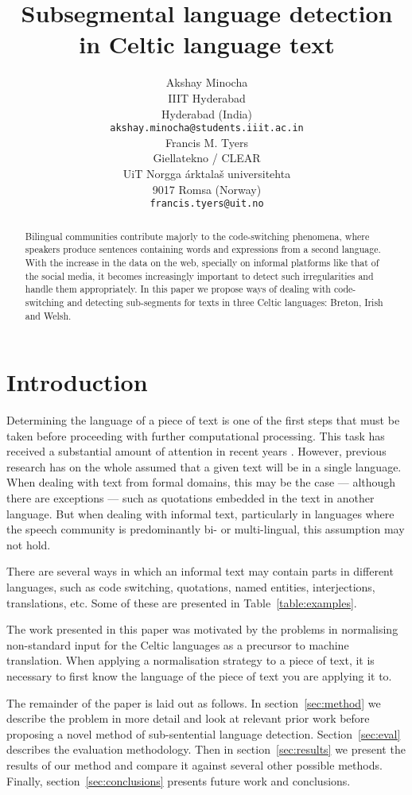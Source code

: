 \documentclass[11pt]{article}
\title{Subsegmental language detection in Celtic language text}
\author{}
\author{Akshay Minocha \\
  IIIT Hyderabad  \\
  Hyderabad (India) \\
  {\small {\tt akshay.minocha@students.iiit.ac.in}} \\\And
  Francis M. Tyers \\
  Giellatekno / CLEAR \\
  UiT Norgga \'arktala\v{s} universitehta  \\
  9017 Romsa (Norway) \\
  {\small {\tt francis.tyers@uit.no}} \\}
\date{}
\begin{document}
\maketitle
\begin{abstract}
  Bilingual communities contribute majorly to the code-switching phenomena, where speakers produce sentences containing words and expressions from a second language. With the increase in the data on the web, specially on informal platforms like that of the social media, it becomes increasingly important to detect such irregularities and handle them appropriately. In this paper we propose ways of dealing with code-switching and detecting sub-segments for texts in three Celtic languages: Breton, Irish and Welsh. 
\end{abstract}

\section{Introduction}
\label{intro}

Determining the language of a piece of text is one of the first steps that must be taken
before proceeding with further computational processing. This task has received a substantial amount of
attention in recent years \cite{cavnar1994n,lui2012langid}. However, previous research has on the whole assumed
that a given text will be in a single language. When dealing with text from formal domains,
this may be the case --- although there are exceptions --- such as quotations embedded in
the text in another language. But when dealing with informal text, particularly in languages
where the speech community is predominantly bi- or multi-lingual, this assumption may not hold.

There are several ways in which an informal text may contain parts in different languages, such as
code switching, quotations, named entities, interjections, translations, etc. Some of these are presented
in Table~\ref{table:examples}.

The work presented in this paper was motivated by the problems in normalising non-standard input
for the Celtic languages as a precursor to machine translation. When applying a normalisation 
strategy to a piece of text, it is necessary to first know the language of the piece of text you 
are applying it to.

The remainder of the paper is laid out as follows. In section~\ref{sec:method} we describe the problem
in more detail and look at relevant prior work before proposing a novel method of sub-sentential
language detection. Section~\ref{sec:eval} describes the evaluation methodology. Then in section~\ref{sec:results}
we present the results of our method and compare it against several other possible methods. Finally, section~\ref{sec:conclusions}
presents future work and conclusions.
\end{document}
